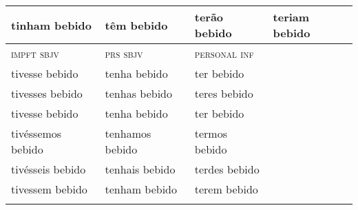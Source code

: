 \documentclass[output=paper,colorlinks,citecolor=brown]{langscibook}
\begin{document}
\begin{table}[H]
\begin{tabular}{llll}
                	tinham	  bebido &têm      bebido &terão	  bebido & teriam  bebido \\
\midrule
\textsc{impft sbjv}&    \textsc{prs sbjv} & \textsc{personal inf}      \\
\midrule
                         tivesse	  bebido &tenha      bebido & ter      bebido &               \\
                         tivesses 	  bebido &tenhas     bebido & teres    bebido &        \\
                         tivesse	  bebido &tenha      bebido & ter      bebido &            \\
                         tivéssemos	  bebido &tenhamos   bebido & termos   bebido &         \\
                         tivésseis	  bebido &tenhais    bebido & terdes   bebido &         	\\
                         tivessem	  bebido &tenham	    bebido & terem    bebido &          \\
\lspbottomrule
\end{tabular}
\end{table}
\end{document}
